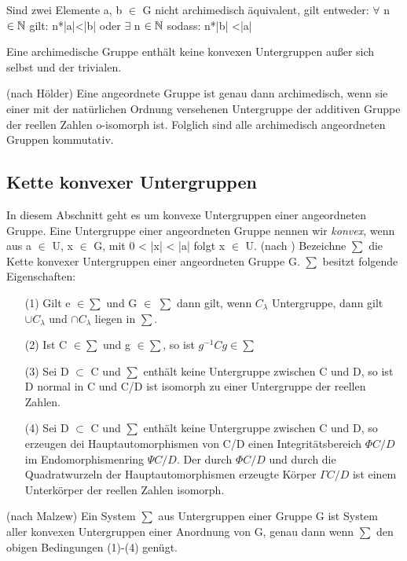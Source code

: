 Sind zwei Elemente a, b $\in$ G nicht archimedisch äquivalent, gilt entweder:
$\forall$ n $\in \mathbb{N}$ gilt: n*|a|<|b| oder $\exists$ n $\in \mathbb{N} $ sodass: n*|b| <|a|
%
\begin{satz}\label{agkku}
Eine archimedische Gruppe enthält keine konvexen Untergruppen außer sich selbst und der trivialen.
\end{satz}
%
%
%
%
\begin{satz}\label{aga} (nach Hölder)
Eine angeordnete Gruppe ist genau dann archimedisch, wenn sie einer mit der natürlichen Ordnung versehenen Untergruppe der additiven Gruppe der reellen Zahlen o-isomorph ist. 
Folglich sind alle archimedisch angeordneten Gruppen kommutativ.
\end{satz}
%
%
%
%
\subsection{Kette konvexer Untergruppen}
In diesem Abschnitt geht es um konvexe Untergruppen einer angeordneten Gruppe. Eine Untergruppe einer angeordneten Gruppe nennen wir \textit{konvex}, wenn aus a $\in$ U, x $\in$ G, mit 0 < |x| < |a| folgt x $\in$ U. (nach \cite{priesscrampe69})
Bezeichne $\sum$ die Kette konvexer Untergruppen einer angeordneten Gruppe G. $\sum$ besitzt folgende Eigenschaften:
\begin{enumerate}
\item[(1)] Gilt e $\in \sum$ und G $\in$ $\sum$ dann gilt, wenn $C_\lambda$ Untergruppe, dann gilt $\cup C_\lambda$ und $\cap C_\lambda$ liegen in $\sum$.
\item[(2)] Ist C $\in\sum$ und g $\in\sum$, so ist $g^{-1}Cg\in\sum$
\item[(3)] Sei D $\subset$ C und $\sum$ enthält keine Untergruppe zwischen C und D, so ist D normal in C und C/D ist isomorph zu einer Untergruppe der reellen Zahlen.
\item[(4)] Sei D $\subset$ C und $\sum$ enthält keine Untergruppe zwischen C und D, so erzeugen dei Hauptautomorphismen von C/D einen Integritätsbereich $\Phi{C/D}$ im Endomorphismenring $\Psi{C/D}$. Der durch $\Phi{C/D}$ und durch die Quadratwurzeln der Hauptautomorphismen erzeugte Körper $\Gamma{C/D}$ ist einem Unterkörper der reellen Zahlen isomorph.
\end{enumerate}
%
\begin{defn}\label{SkUgr}  (nach Malzew)
Ein System $\sum$ aus Untergruppen einer Gruppe G ist System aller konvexen Untergruppen einer Anordnung von G, genau dann wenn $\sum$ den obigen Bedingungen (1)-(4) genügt.
\end{defn}
%
%
